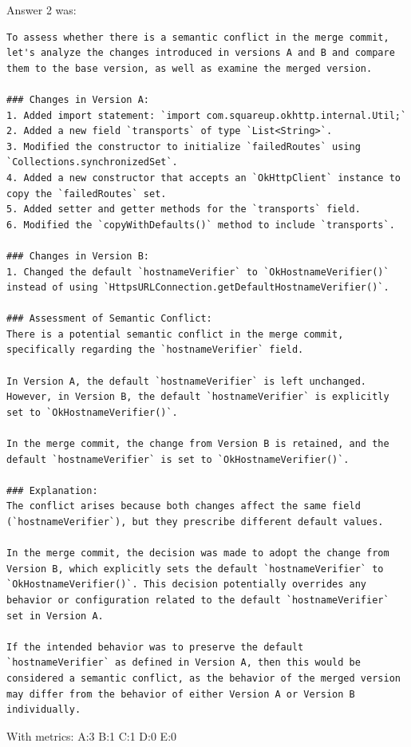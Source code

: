 Answer 2 was:
\begin{lstlisting}
To assess whether there is a semantic conflict in the merge commit, let's analyze the changes introduced in versions A and B and compare them to the base version, as well as examine the merged version.

### Changes in Version A:
1. Added import statement: `import com.squareup.okhttp.internal.Util;`
2. Added a new field `transports` of type `List<String>`.
3. Modified the constructor to initialize `failedRoutes` using `Collections.synchronizedSet`.
4. Added a new constructor that accepts an `OkHttpClient` instance to copy the `failedRoutes` set.
5. Added setter and getter methods for the `transports` field.
6. Modified the `copyWithDefaults()` method to include `transports`.

### Changes in Version B:
1. Changed the default `hostnameVerifier` to `OkHostnameVerifier()` instead of using `HttpsURLConnection.getDefaultHostnameVerifier()`.

### Assessment of Semantic Conflict:
There is a potential semantic conflict in the merge commit, specifically regarding the `hostnameVerifier` field.

In Version A, the default `hostnameVerifier` is left unchanged. However, in Version B, the default `hostnameVerifier` is explicitly set to `OkHostnameVerifier()`.

In the merge commit, the change from Version B is retained, and the default `hostnameVerifier` is set to `OkHostnameVerifier()`.

### Explanation:
The conflict arises because both changes affect the same field (`hostnameVerifier`), but they prescribe different default values.

In the merge commit, the decision was made to adopt the change from Version B, which explicitly sets the default `hostnameVerifier` to `OkHostnameVerifier()`. This decision potentially overrides any behavior or configuration related to the default `hostnameVerifier` set in Version A.

If the intended behavior was to preserve the default `hostnameVerifier` as defined in Version A, then this would be considered a semantic conflict, as the behavior of the merged version may differ from the behavior of either Version A or Version B individually.
\end{lstlisting}

With metrics:
A:3
B:1
C:1
D:0
E:0

